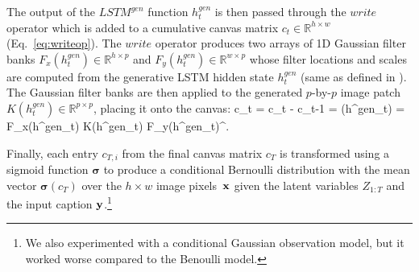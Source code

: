 \documentclass{article} %
\newcommand{\Eqref}[1]{Eq.~\ref{#1}} %
\def\beqa#1\eeqa{\begin{eqnarray}#1\end{eqnarray}}
\newcommand{\sigmoid}{\boldsymbol{\sigma}}
\newcommand{\hdec}{h^{gen}}
\newcommand{\writeop}{\mathit{write}}
\newcommand{\decoder}{\mathit{LSTM}^{gen}}
\newcommand{\canv}{c}
\newcommand{\Lat}{Z}
\newcommand{\icaption}{{\bf{y}}}
\newcommand{\oimage}{{\bf{x}}}
\newcommand{\gFilterx}{F_x}
\newcommand{\gFiltery}{F_y}
\newcommand{\WriteFunc}{K}
\newcommand{\real}{\mathbb{R}}
\begin{document}
The output of the $\decoder$ function $\hdec_t$ is then passed through the $\writeop$ operator 
which is added to a cumulative canvas matrix $c_t \in \real^{h \times w}$ (\Eqref{eq:writeop}). 
The $\writeop$ operator produces two arrays of 1D Gaussian filter banks $\gFilterx(\hdec_t)\in\real^{h\times p}$ and $\gFiltery(\hdec_t)\in\real^{w\times p}$ whose filter locations and scales are computed from the generative LSTM hidden state $\hdec_t$ (same as defined in \cite{gregor_draw}). 
The Gaussian filter banks are then applied to the generated $p$-by-$p$ image patch $\WriteFunc(\hdec_t) \in \real^{p\times p}$, placing it onto the canvas:
\beqa
\label{eq:write}
\Delta \canv_{t} = \canv_{t} - \canv_{t-1} = \writeop(\hdec_t) = \gFilterx(\hdec_t) \WriteFunc(\hdec_t) \gFiltery(\hdec_t)^\top. 
\eeqa

Finally, each entry $\canv_{T,i}$ from the final canvas matrix $\canv_T$ is transformed using a sigmoid function $\sigmoid$ to produce a conditional Bernoulli 
distribution with the mean vector $\sigmoid(\canv_{T})$ over the 
$h\times w$ image pixels~$\oimage$ given the latent variables 
$\Lat_{1:T}$ and the input caption $\icaption$.\footnote{We also experimented with a conditional Gaussian observation model, but
it worked worse compared to the Benoulli model.}
\end{document}
